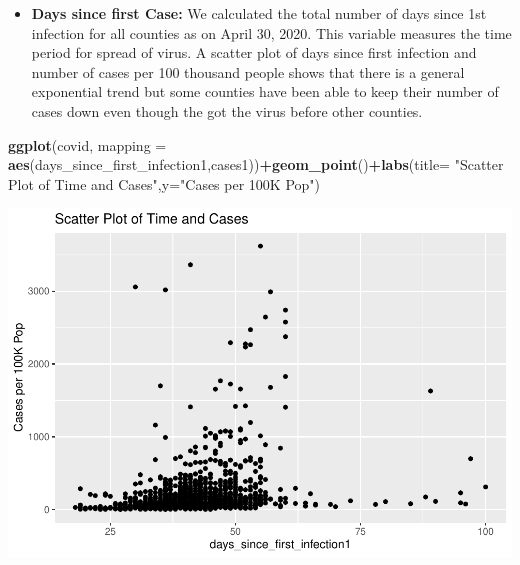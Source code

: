 \documentclass[
]{article}
\newenvironment{Shaded}{\begin{snugshade}}{\end{snugshade}}
\newcommand{\DataTypeTok}[1]{\textcolor[rgb]{0.13,0.29,0.53}{#1}}
\newcommand{\KeywordTok}[1]{\textcolor[rgb]{0.13,0.29,0.53}{\textbf{#1}}}
\newcommand{\NormalTok}[1]{#1}
\newcommand{\OperatorTok}[1]{\textcolor[rgb]{0.81,0.36,0.00}{\textbf{#1}}}
\newcommand{\StringTok}[1]{\textcolor[rgb]{0.31,0.60,0.02}{#1}}
\providecommand{\tightlist}{%
  \setlength{\itemsep}{0pt}\setlength{\parskip}{0pt}}
\begin{document}
\begin{itemize}
\tightlist
\item
  \textbf{Days since first Case:} We calculated the total number of days
  since 1st infection for all counties as on April 30, 2020. This
  variable measures the time period for spread of virus. A scatter plot
  of days since first infection and number of cases per 100 thousand
  people shows that there is a general exponential trend but some
  counties have been able to keep their number of cases down even though
  the got the virus before other counties.
\end{itemize}

\begin{Shaded}
\begin{Highlighting}[]
\KeywordTok{ggplot}\NormalTok{(covid, }\DataTypeTok{mapping =} \KeywordTok{aes}\NormalTok{(days_since_first_infection1,cases1))}\OperatorTok{+}\KeywordTok{geom_point}\NormalTok{()}\OperatorTok{+}\KeywordTok{labs}\NormalTok{(}\DataTypeTok{title=} \StringTok{"Scatter Plot of Time and Cases"}\NormalTok{,}\DataTypeTok{y=}\StringTok{"Cases per 100K Pop"}\NormalTok{)}
\end{Highlighting}
\end{Shaded}

\includegraphics{covid_tree_analysis_files/figure-latex/unnamed-chunk-4-1.pdf}
\end{document}
